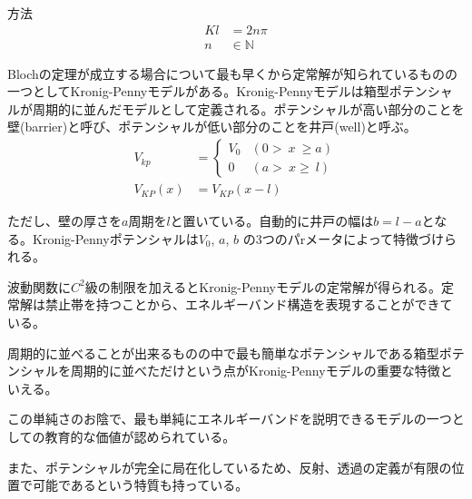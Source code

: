 \documentclass[a4paper, lualatex]{bxjsarticle}
\begin{document}
\begin{section}{方法}
        \begin{align}
         Kl&=2n\pi\nonumber\\
            n&\in \mathbb{N}
        \end{align}
        \par Blochの定理が成立する場合について最も早くから定常解が知られているものの一つとしてKronig-Pennyモデルがある。Kronig-Pennyモデルは箱型ポテンシャルが周期的に並んだモデルとして定義される。ポテンシャルが高い部分のことを壁(barrier)と呼び、ポテンシャルが低い部分のことを井戸(well)と呼ぶ。
        \begin{align}
         V_{kp}&=\begin{cases}V_0&(0\gt\ x\ \ge a)\\ 0&(a\gt\ x\ge\ l)\end{cases}\nonumber\\
            V_{KP}(x)&=V_{KP}(x-l)
        \end{align}
        \par ただし、壁の厚さを$a$周期を$l$と置いている。自動的に井戸の幅は$b=l-a$となる。Kronig-Pennyポテンシャルは$V_0$, $a$, $b$ の3つのパrメータによって特徴づけられる。
        \par 波動関数に$C^2$級の制限を加えるとKronig-Pennyモデルの定常解が得られる。定常解は禁止帯を持つことから、エネルギーバンド構造を表現することができている。
        \par 周期的に並べることが出来るものの中で最も簡単なポテンシャルである箱型ポテンシャルを周期的に並べただけという点がKronig-Pennyモデルの重要な特徴といえる。
        \par この単純さのお陰で、最も単純にエネルギーバンドを説明できるモデルの一つとしての教育的な価値が認められている。
        \par また、ポテンシャルが完全に局在化しているため、反射、透過の定義が有限の位置で可能であるという特質も持っている。
    \end{section}
\end{document}
